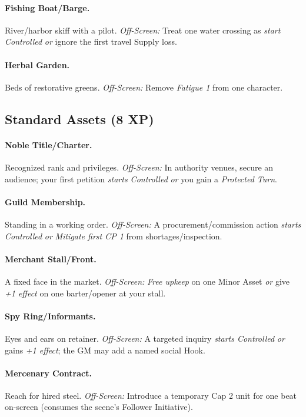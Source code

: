 \documentclass[11pt]{article}
\begin{document}
\paragraph{Fishing Boat/Barge.} River/harbor skiff with a pilot.
\emph{Off-Screen:} Treat one water crossing as \emph{start Controlled} \emph{or} ignore the first travel Supply loss.

\paragraph{Herbal Garden.} Beds of restorative greens.
\emph{Off-Screen:} Remove \emph{Fatigue 1} from one character.

\subsection*{Standard Assets (8 XP)}
\paragraph{Noble Title/Charter.} Recognized rank and privileges.
\emph{Off-Screen:} In authority venues, secure an audience; your first petition \emph{starts Controlled} \emph{or} you gain a \emph{Protected Turn}.

\paragraph{Guild Membership.} Standing in a working order.
\emph{Off-Screen:} A procurement/commission action \emph{starts Controlled} \emph{or} \emph{Mitigate first CP 1} from shortages/inspection.

\paragraph{Merchant Stall/Front.} A fixed face in the market.
\emph{Off-Screen:} \emph{Free upkeep} on one Minor Asset \emph{or} give \emph{+1 effect} on one barter/opener at your stall.

\paragraph{Spy Ring/Informants.} Eyes and ears on retainer.
\emph{Off-Screen:} A targeted inquiry \emph{starts Controlled} \emph{or} gains \emph{+1 effect}; the GM may add a named social Hook.

\paragraph{Mercenary Contract.} Reach for hired steel.
\emph{Off-Screen:} Introduce a temporary Cap 2 unit for one beat on-screen (consumes the scene’s Follower Initiative).
\end{document}

